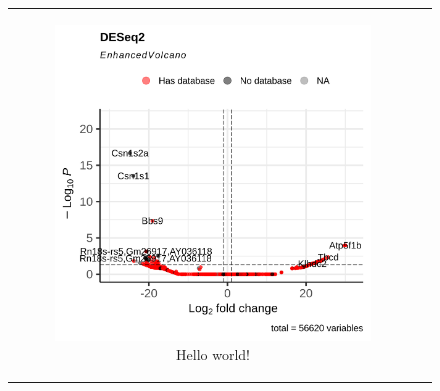 \begin{figure}[H] \begin{tabular}{cc}
        \begin{subfigure}{0.5\textwidth} \centering

            \includegraphics[width=\linewidth]{chapters/4_results_and_discussion/figures/dea/deseq2/letrozole/volcano.png}
            \caption{Hello world!
            }
            \label{fig:letrozole_volcano_deseq2}
        \end{subfigure}
        \begin{subfigure}{0.5\textwidth}
            \centering


\end{subfigure}
\end{tabular}
\end{figure}
